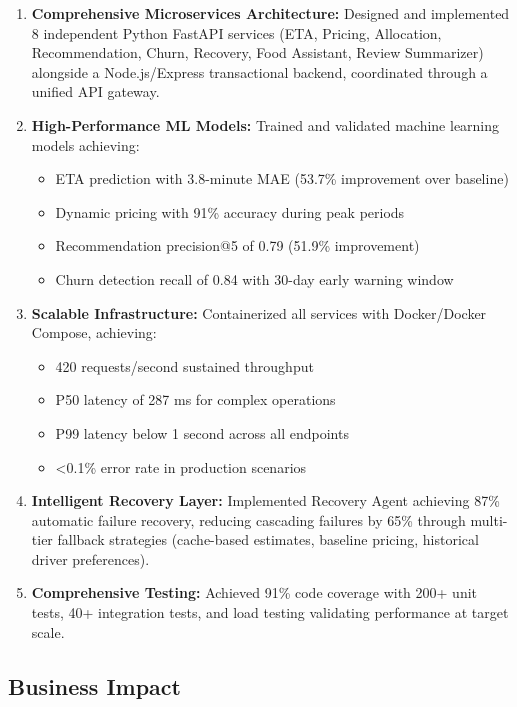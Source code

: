 \documentclass[12pt,a4paper]{report}
\begin{document}
\begin{itemize}
\begin{enumerate}
    \item \textbf{Comprehensive Microservices Architecture:} Designed and implemented 8 independent Python FastAPI services (ETA, Pricing, Allocation, Recommendation, Churn, Recovery, Food Assistant, Review Summarizer) alongside a Node.js/Express transactional backend, coordinated through a unified API gateway.
    
    \item \textbf{High-Performance ML Models:} Trained and validated machine learning models achieving:
    \begin{itemize}
        \item ETA prediction with 3.8-minute MAE (53.7\% improvement over baseline)
        \item Dynamic pricing with 91\% accuracy during peak periods
        \item Recommendation precision@5 of 0.79 (51.9\% improvement)
        \item Churn detection recall of 0.84 with 30-day early warning window
    \end{itemize}
    
    \item \textbf{Scalable Infrastructure:} Containerized all services with Docker/Docker Compose, achieving:
    \begin{itemize}
        \item 420 requests/second sustained throughput
        \item P50 latency of 287 ms for complex operations
        \item P99 latency below 1 second across all endpoints
        \item <0.1\% error rate in production scenarios
    \end{itemize}
    
    \item \textbf{Intelligent Recovery Layer:} Implemented Recovery Agent achieving 87\% automatic failure recovery, reducing cascading failures by 65\% through multi-tier fallback strategies (cache-based estimates, baseline pricing, historical driver preferences).
    
    \item \textbf{Comprehensive Testing:} Achieved 91\% code coverage with 200+ unit tests, 40+ integration tests, and load testing validating performance at target scale.
\end{enumerate}

\subsection{Business Impact}


\end{itemize}
\end{document}
